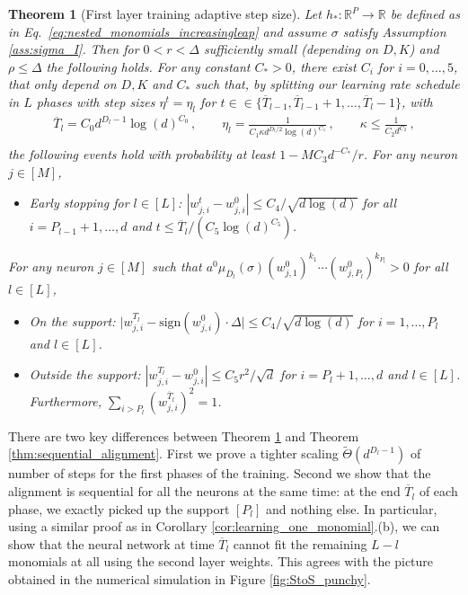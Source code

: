 \documentclass[11pt]{article}
\newcommand{\R}{\mathbb{R}}
\newcommand{\<}{\langle}
\renewcommand{\>}{\rangle}
\newcommand{\sign}{\text{sign}}
\newtheorem{theorem}{Theorem}
\theoremstyle{definition}
\def\oT{\overline{T}}
\def\oD{\overline{D}}
\def\oD{\overline{D}}
\begin{document}
\begin{theorem}[First layer training adaptive step size]\label{thm:sequential_alignment_adaptive} Let $h_* : \R^P \to \R$ be defined as in Eq.~\eqref{eq:nested_monomials_increasingleap} and assume $\sigma$ satisfy Assumption \ref{ass:sigma_I}. Then for $0 < r < \Delta$ sufficiently small (depending on $D,K$) and $\rho \leq \Delta$ the following holds. For any constant $C_*>0$, there exist $C_i$ for $i= 0, \ldots , 5$, that only depend on $D,K$ and $C_*$ such that, by splitting our learning rate schedule in $L$ phases with step sizes $\eta^t = \eta_l$ for $t \in \in \{\oT_{l-1},\oT_{l-1}+1, \ldots ,\oT_l- 1\}$, with
\[
\begin{aligned}
 \oT_l = C_0 d^{D_l-1} \log(d)^{C_0}\, , \qquad \eta_l = \frac{1}{C_1 \kappa d^{D_l/2} \log(d)^{C_1} }\, , \qquad \kappa \leq \frac{1}{C_2 d^{C_2}}\,, \\
\end{aligned}
\]
the following events hold with probability at least $1 - MC_3 d^{-C_*}/r$. For any neuron $j \in [M]$, 
\begin{itemize}
    \item[(a)] Early stopping for $l\in [L]$: $|w_{j,i}^t - w_{j,i}^0| \leq C_4/\sqrt{d \log (d)}$ for all $i = P_{l-1} +1 , \ldots , d$ and $t \leq \oT_l / (C_5 \log (d)^{C_5} )$.
\end{itemize}

For any neuron $j\in[M]$ such that $a^0 \mu_{\oD_l } (\sigma) (w_{j,1}^0)^{k_1} \cdots (w_{j,P_l}^0)^{k_{P_l}} > 0$ for all $l \in [L]$,
\begin{itemize}
    \item[(b)] On the support: $\big\vert  w_{j,i}^{T_l}  - \sign (w_{j,i}^0) \cdot \Delta \big\vert \leq C_4 /\sqrt{d \log (d)}$ for $i = 1, \ldots , P_l$ and $l \in [L]$.

    
    \item[(c)] Outside the support: $| w_{j,i}^{T_l} - w_{j,i}^0| \leq C_5 r^2 /\sqrt{d}$ for $i = P_l+1, \ldots , d$ and $l \in [L]$. Furthermore, $\sum_{i >P_l} (w_{j,i}^{\oT_l} )^2 = 1$.
\end{itemize}
\end{theorem}

There are two key differences between Theorem \ref{thm:sequential_alignment_adaptive} and Theorem \ref{thm:sequential_alignment}. First we prove a tighter scaling $\widetilde{\Theta} (d^{D_l -1})$ of number of steps for the first phases of the training. Second we show that the alignment is sequential for all the neurons at the same time: at the end $\oT_l$ of each phase, we exactly picked up the support $[P_l]$ and nothing else. In particular, using a similar proof as in Corollary \ref{cor:learning_one_monomial}.(b), we can show that the neural network at time $\oT_l$ cannot fit the remaining $L-l$ monomials at all using the second layer weights. This agrees with the picture obtained in the numerical simulation in Figure \ref{fig:StoS_punchy}.
\end{document}
